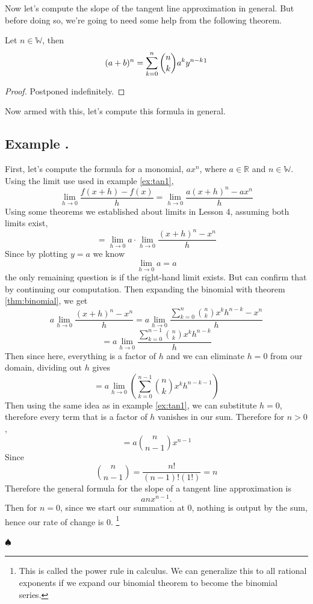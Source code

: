 \documentclass[11pt]{article}
\numberwithin{lemma}{section}
\numberwithin{equation}{section}
\numberwithin{define}{section}
\numberwithin{prop}{section}
\numberwithin{figure}{section}
\numberwithin{thm}{section}
\numberwithin{cor}{section}
\newcounter{ex}[section]
\newenvironment{ex}[0]{

	\refstepcounter{ex}
    \subsection*{Example \theex .}
    }
    {
    \hfill$\spadesuit$
    \par
    }
\numberwithin{ex}{section}
\def\real{\mathbb{R}}
\def\paren#1{\left(#1\right)}
\begin{document}
Now let's compute the slope of the tangent line approximation in general. But before doing so, we're going to need some help from the following theorem.

\begin{thm}
Let $n\in\mathbb{W}$, then
$$(a+b)^n=\sum^n_{k=0}\binom{n}{k}a^ky^{n-k}\footnotemark$$
\label{thm:binomial}
\end{thm}
\addtocounter{footnote}{-1}
\begin{proof}
	Postponed indefinitely.
\end{proof}

Now armed with this, let's compute this formula in general.

\begin{ex}
	First, let's compute the formula for a monomial, $ax^n$, where $a\in\real$ and $n\in\mathbb{W}$. Using the limit use used in example \eqref{ex:tan1},
	$$\lim_{h\to0}\frac{f(x+h)-f(x)}{h}=\lim_{h\to0}\frac{a(x+h)^n-ax^n}{h}$$
	Using some theorems we established about limits in Lesson 4, assuming both limits exist,
	$$=\lim_{h\to0}a \cdot \lim_{h\to0}\frac{(x+h)^n-x^n}{h}$$
	Since by plotting $y=a$ we know
	$$\lim_{h\to0}a=a$$
	the only remaining question is if the right-hand limit exists. But can confirm that by continuing our computation.
	Then expanding the binomial with theorem \eqref{thm:binomial}, we get
	$$a  \lim_{h\to0}\frac{(x+h)^n-x^n}{h}
	=a \lim_{h\to0}\frac{\sum^n_{k=0}\binom{n}{k}x^kh^{n-k}-x^n}{h}$$
	$$=a \lim_{h\to0}\frac{\sum^{n-1}_{k=0}\binom{n}{k}x^kh^{n-k}}{h}$$
	Then since here, everything is a factor of $h$ and we can eliminate $h=0$ from our domain, dividing out $h$ gives
	$$=a \lim_{h\to0}\paren{\sum^{n-1}_{k=0}\binom{n}{k}x^kh^{n-k-1}}$$
	Then using the same idea as in example \eqref{ex:tan1}, we can substitute $h=0$, therefore every term that is a factor of $h$ vanishes in our sum. Therefore for $n>0$,
	$$=a \binom{n}{n-1}x^{n-1}$$
	Since
	$$\binom{n}{n-1}=\frac{n!}{{(n-1)}!(1!)}=n$$
	Therefore the general formula for the slope of a tangent line approximation is
	$$anx^{n-1}.$$
	Then for $n=0$, since we start our summation at $0$, nothing is output by the sum, hence our rate of change is 0. \footnote{This is called the power rule in calculus. We can generalize this to all rational exponents if we expand our binomial theorem to become the binomial series.}
	\label{ex:gentan}
\end{ex}
\end{document}
